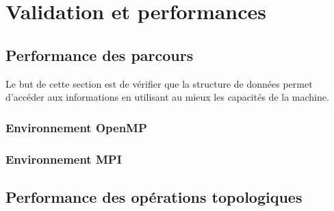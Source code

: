\section{Validation et performances}

\subsection{Performance des parcours}

Le but de cette section est de vérifier que la structure de données permet d'accéder aux informations en utilisant au mieux les capacités de la machine. 

\subsubsection{Environnement OpenMP}

\paragraph{}

\subsubsection{Environnement MPI}

\subsection{Performance des opérations topologiques}